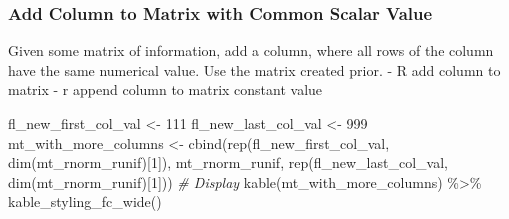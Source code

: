 \documentclass[
]{book}
\newenvironment{Shaded}{\begin{snugshade}}{\end{snugshade}}
\newcommand{\CommentTok}[1]{\textcolor[rgb]{0.56,0.35,0.01}{\textit{#1}}}
\newcommand{\DecValTok}[1]{\textcolor[rgb]{0.00,0.00,0.81}{#1}}
\newcommand{\FunctionTok}[1]{\textcolor[rgb]{0.00,0.00,0.00}{#1}}
\newcommand{\NormalTok}[1]{#1}
\newcommand{\OtherTok}[1]{\textcolor[rgb]{0.56,0.35,0.01}{#1}}
\newcommand{\SpecialCharTok}[1]{\textcolor[rgb]{0.00,0.00,0.00}{#1}}
\begin{document}
\begin{table}[!h]
\centering
{}
\end{table}

\hypertarget{add-column-to-matrix-with-common-scalar-value}{%
\subsubsection{Add Column to Matrix with Common Scalar Value}\label{add-column-to-matrix-with-common-scalar-value}}

Given some matrix of information, add a column, where all rows of the column have the same numerical value. Use the matrix created prior.
- R add column to matrix
- r append column to matrix constant value

\begin{Shaded}
\begin{Highlighting}[]
\NormalTok{fl\_new\_first\_col\_val }\OtherTok{\textless{}{-}} \DecValTok{111}
\NormalTok{fl\_new\_last\_col\_val }\OtherTok{\textless{}{-}} \DecValTok{999}
\NormalTok{mt\_with\_more\_columns }\OtherTok{\textless{}{-}} \FunctionTok{cbind}\NormalTok{(}\FunctionTok{rep}\NormalTok{(fl\_new\_first\_col\_val, }\FunctionTok{dim}\NormalTok{(mt\_rnorm\_runif)[}\DecValTok{1}\NormalTok{]), }
\NormalTok{                              mt\_rnorm\_runif,}
                              \FunctionTok{rep}\NormalTok{(fl\_new\_last\_col\_val, }\FunctionTok{dim}\NormalTok{(mt\_rnorm\_runif)[}\DecValTok{1}\NormalTok{]))}
\CommentTok{\# Display}
\FunctionTok{kable}\NormalTok{(mt\_with\_more\_columns) }\SpecialCharTok{\%\textgreater{}\%} \FunctionTok{kable\_styling\_fc\_wide}\NormalTok{()}
\end{Highlighting}
\end{Shaded}
\end{document}
